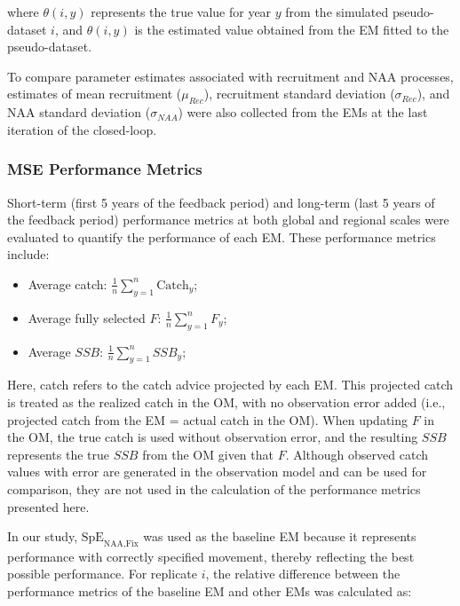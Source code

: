 \documentclass[
  12pt,
]{article}
\begin{document}
where \(\theta(i,y)\) represents the true value for year \(y\) from the
simulated pseudo-dataset \(i\), and \(\hat{\theta}(i,y)\) is the
estimated value obtained from the EM fitted to the pseudo-dataset.

To compare parameter estimates associated with recruitment and NAA
processes, estimates of mean recruitment (\(\mu_{Rec}\)), recruitment
standard deviation (\(\sigma_{Rec}\)), and NAA standard deviation
(\(\sigma_{NAA}\)) were also collected from the EMs at the last
iteration of the closed-loop.

\hypertarget{mse-performance-metrics}{%
\subsubsection{MSE Performance Metrics}\label{mse-performance-metrics}}

Short-term (first 5 years of the feedback period) and long-term (last 5
years of the feedback period) performance metrics at both global and
regional scales were evaluated to quantify the performance of each EM.
These performance metrics include:

\begin{itemize}
\item
  Average catch: \(\frac{1}{n} \sum_{y=1}^{n} {\text{Catch}}_y\);
\item
  Average fully selected \({F}\): \(\frac{1}{n} \sum_{y=1}^{n} {F}_y\);
\item
  Average \({SSB}\): \(\frac{1}{n} \sum_{y=1}^{n} {SSB}_y\);
\end{itemize}

Here, catch refers to the catch advice projected by each EM. This
projected catch is treated as the realized catch in the OM, with no
observation error added (i.e., projected catch from the EM = actual
catch in the OM). When updating \(F\) in the OM, the true catch is used
without observation error, and the resulting \(SSB\) represents the true
\(SSB\) from the OM given that \(F\). Although observed catch values
with error are generated in the observation model and can be used for
comparison, they are not used in the calculation of the performance
metrics presented here.

In our study, \(\text{SpE}_{\scriptscriptstyle \text{NAA,Fix}}\) was
used as the baseline EM because it represents performance with correctly
specified movement, thereby reflecting the best possible performance.
For replicate \(i\), the relative difference between the performance
metrics of the baseline EM and other EMs was calculated as:
\end{document}
